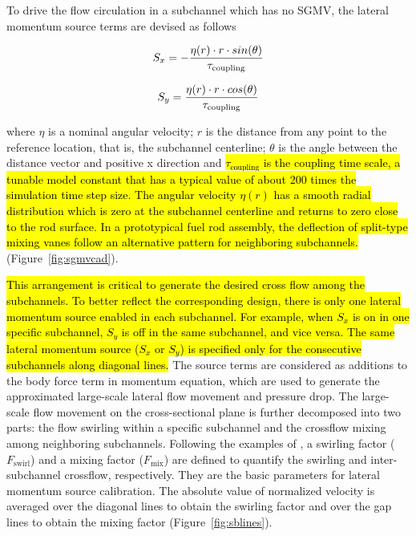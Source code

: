 To drive the flow circulation in a subchannel which has no SGMV, the lateral momentum source terms are devised as follows

\begin{equation}
  S_x = -\frac{\eta(r)\cdot r \cdot sin(\theta)}{\tau_\text{coupling}}\\
\end{equation}

\begin{equation}
  S_y =  \frac{\eta(r)\cdot r \cdot cos(\theta)}{\tau_\text{coupling}}\\
\end{equation}

where $\eta$ is a nominal angular velocity;
$r$ is the distance from any point to the reference location, that is, the subchannel centerline;
$\theta$ is the angle between the distance vector and positive x direction and
\hl{$\tau_\text{coupling}$ is the coupling time scale, a tunable model constant that has a typical value of about 200 times the simulation time step size.
The angular velocity $\eta(r)$ has a smooth radial distribution which is zero at the subchannel centerline and returns to zero close to the rod surface.
In a prototypical fuel rod assembly, the deflection of split-type mixing vanes follow an alternative pattern for neighboring subchannels.} (Figure~\ref{fig:sgmvcad}).

\hl{This arrangement is critical to generate the desired cross flow among the subchannels.
To better reflect the corresponding design, there is only one lateral momentum source enabled in each subchannel.
For example, when $S_x$ is on in one specific subchannel, $S_y$ is off in the same subchannel, and vice versa.
The same lateral momentum source ($S_x$ or $S_y$) is specified only for the consecutive subchannels along diagonal lines.} 
The source terms are considered as additions to the body force term in momentum equation, which are used to generate the approximated large-scale lateral flow movement and pressure drop.
The large-scale flow movement on the cross-sectional plane is further decomposed into two parts: the flow swirling within a specific subchannel and the crossflow mixing among neighboring subchannels.
Following the examples of \cite{Chang2014},
a swirling factor ($F_\text{swirl}$) and a mixing factor ($F_\text{mix}$) are defined to quantify the swirling and inter-subchannel crossflow, respectively.
They are the basic parameters for lateral momentum source calibration.
The absolute value of normalized velocity is averaged over the diagonal lines to obtain the swirling factor and over the gap lines to obtain the mixing factor (Figure~\ref{fig:sblines}).



